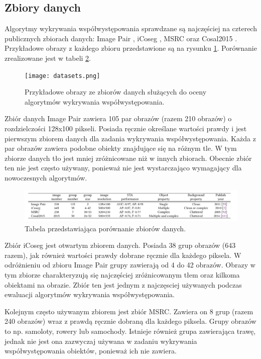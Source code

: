 \documentclass[a4paper,11pt, notitlepage, twosides, openany ]{report}
\begin{document}
	\subsection{Zbiory danych}
	Algorytmy wykrywania współwystępowania sprawdzane są najczęściej na czterech publicznych zbiorach danych: Image Pair \cite{ImagePair}, iCoseg \cite{iCoseg}, MSRC \cite{MSRC} oraz Cosal2015 \cite{cosal2015}. Przykładowe obrazy z każdego zbioru przedstawione są na rysunku \ref{ds}. Porównanie zrealizowane jest w tabeli \ref{table}.

	\begin{figure}[h]
		\centering
		\texttt{[image: datasets.png]}
		\caption{Przykładowe obrazy ze zbiorów danych służących do oceny algorytmów wykrywania współwystępowania.}
		\label{ds}
	\end{figure}

	Zbiór danych Image Pair zawiera 105 par obrazów (razem 210 obrazów) o rozdzielczości 128x100 pikseli. Posiada ręcznie określane wartości prawdy i jest pierwszym zbiorem danych dla zadania wykrywania współwystępowania. Każda z par obrazów zawiera podobne obiekty znajdujące się na różnym tle. W tym zbiorze danych tło jest mniej zróżnicowane niż w innych zbiorach. Obecnie zbiór ten nie jest często używany, ponieważ nie jest wystarczająco wymagający dla nowoczesnych algorytmów.
	
	\begin{figure}[h]
		\centering
		\includegraphics[width=1\textwidth]{ds_comp.png}
		\caption{Tabela przedstawiająca porównanie zbiorów danych.}
		\label{table}
	\end{figure}

	Zbiór iCoseg jest otwartym zbiorem danych. Posiada 38 grup obrazów (643 razem), jak również wartości prawdy dobrane ręcznie dla każdego piksela. W odróżnieniu od zbioru Image Pair grupy zawierają od 4 do 42 obrazów. Obrazy w tym zbiorze charakteryzują się najczęściej zróżnicowanym tłem oraz kilkoma obiektami na obrazie. Zbiór ten jest jednym z najczęsciej używanych podczas ewaluacji algorytmów wykrywania współwystępowania.

	Kolejnym często używanym zbiorem jest zbiór MSRC. Zawiera on 8 grup (razem 240 obrazów) wraz z prawdą ręcznie dobraną dla każdego piksela. Grupy obrazów to np. samoloty, rowery lub samochody. Istnieje również grupa zawierająca trawę, jednak nie jest ona zazwyczaj używana w zadaniu wykrywania współwystępowania obiektów, ponieważ ich nie zawiera.
\end{document}
